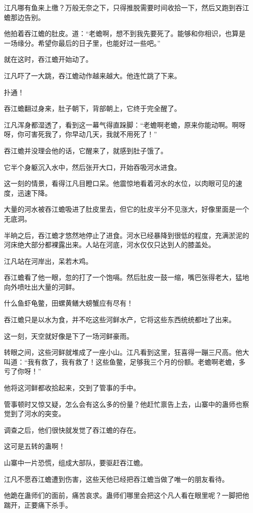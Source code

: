 \begin{this_body}
江凡哪有鱼来上缴？万般无奈之下，只得推脱需要时间收拾一下，然后又跑到吞江蟾那边告别。

他拍着吞江蟾的肚皮。道：“老蟾啊，想不到我先要死了。能够和你相识，也算是一场缘分。希望你最后的日子里，也能好过一些吧。”

就在这时，吞江蟾开始动了。

江凡吓了一大跳，吞江蟾动作越来越大。他连忙跳了下来。

扑通！

吞江蟾翻过身来，肚子朝下，背部朝上，它终于完全醒了。

江凡浑身都湿透了，看到这一幕气得直跺脚：“老蟾啊老蟾，原来你能动啊。啊呀呀，你可害死我了，你早动几天，我就不用死了！”

吞江蟾并没理会他的话，它醒来了，就感到肚子饿了。

它半个身躯沉入水中，然后张开大口，开始吞吸河水进食。

这一刻的情景，看得江凡目瞪口呆。他震惊地看着河水的水位，以肉眼可见的速度，迅速下降。

大量的河水被吞江蟾吸进了肚皮里去，但它的肚皮半分不见涨大，好像里面是一个无底洞。

半晌之后，吞江蟾才悠然地停止了进食。河水已经暴降到很低的程度，充满淤泥的河床绝大部分都裸露出来。人站在河底，河水仅仅只达到人的膝盖处。

江凡站在河岸出，呆若木鸡。

吞江蟾看了他一眼，忽的打了一个饱嗝。然后肚皮一鼓一缩，嘴巴张得老大，猛地向外喷吐出大量的河鲜。

什么鱼虾龟鳖，田螺黄鳝大螃蟹应有尽有！

吞江蟾只是以水为食，并不吃这些河鲜水产，它将这些东西统统都吐了出来。

这一刻，天空就好像是下了一场河鲜豪雨。

转眼之间，这些河鲜就堆成了一座小山。江凡看到这里，狂喜得一蹦三尺高。他大叫道：“我有救了，我有救了！这些鱼鳖，足够我三个月的份额。老蟾啊老蟾，多亏了你呀！”

他将这河鲜都收拾起来，交到了管事的手中。

管事顿时又惊又疑，怎么会有这么多的份量？他赶忙禀告上去，山寨中的蛊师也察觉到了河水的突变。

调查之后，他们很快就发觉了吞江蟾的存在。

这可是五转的蛊啊！

山寨中一片恐慌，组成大部队，要驱赶吞江蟾。

江凡不愿吞江蟾遭到伤害，这些天他已经把吞江蟾当做了唯一的朋友看待。

他跪在蛊师们的面前，痛苦哀求。蛊师们哪里会把这个凡人看在眼里呢？一脚把他踹开，正要痛下杀手。


\end{this_body}
